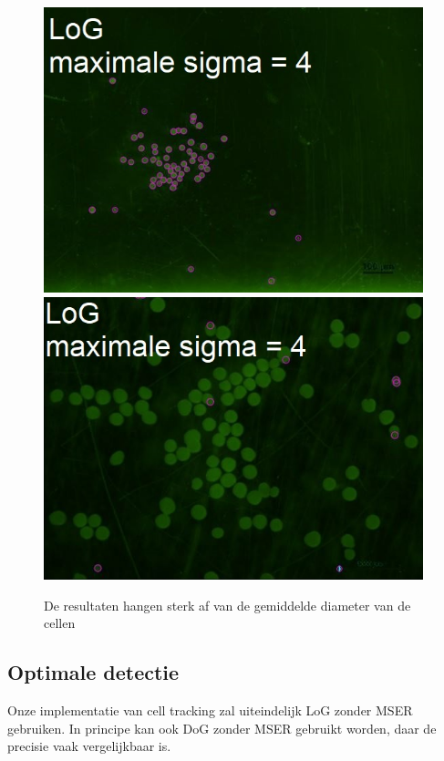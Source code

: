 \documentclass{article}
\begin{document}
\begin{multicols}{2}
\begin{figure}[H]
\centering
\includegraphics[width=0.98\textwidth]{images/log_fix_min_sigma_good.JPG}
\includegraphics[width=0.98\textwidth]{images/log_fix_min_sigma_bad.JPG}
\caption{\label{fig:fix_min_sigma}De resultaten hangen sterk af van de gemiddelde diameter van de cellen}
\end{figure}

\subsection{Optimale detectie}
\label{sec:optimal_detection}
Onze implementatie van cell tracking zal uiteindelijk LoG zonder MSER gebruiken. In principe kan ook DoG zonder MSER gebruikt worden, daar de precisie vaak vergelijkbaar is.


\end{multicols}
\end{document}
